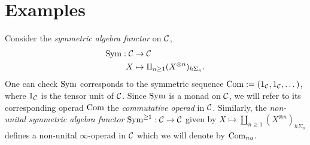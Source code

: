%
%
%
%

\section{Examples}
\begin{example}
	Consider the \emph{symmetric algebra functor} on ${\mathcal{C}}$,
	\begin{align*}
		\operatorname{Sym}:{\mathcal{C}} & \to  {\mathcal{C}}\\
		X & \mapsto \amalg_{n\geq 1} (X^{\otimes n})_{h\Sigma_n}.
	\end{align*}
	One can check $\operatorname{Sym}$ corresponds to the symmetric sequence $\operatorname{Com}:=(1_{\mathcal{C}},1_{\mathcal{C}},\dots)$, where $1_{\mathcal{C}}$ is the tensor unit of ${\mathcal{C}}$.
	Since $\operatorname{Sym}$ is a monad on ${\mathcal{C}}$, 
	we will refer to its corresponding operad $\operatorname{Com}$ the \emph{commutative operad} in ${\mathcal{C}}$.
	Similarly, the \emph{non-unital symmetric algebra functor} $\operatorname{Sym}^{\geq 1}:{\mathcal{C}} \to {\mathcal{C}}$ given by $X\mapsto \amalg_{n\geq 1} (X^{\otimes n})_{h\Sigma_n}$ defines a non-unital $\infty$-operad in ${\mathcal{C}}$ which we will denote by $\operatorname{Com}_{nu}$.
\end{example}

